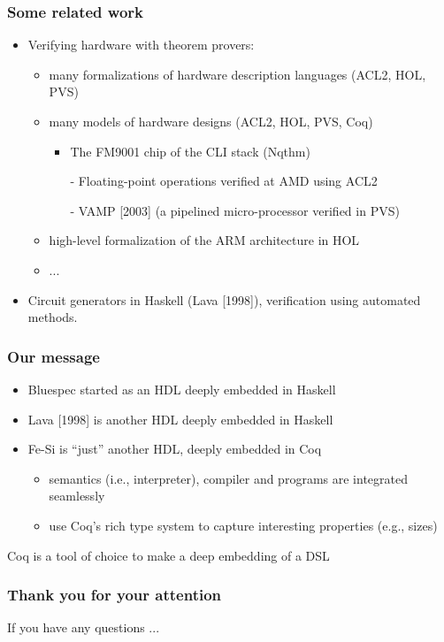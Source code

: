 \documentclass[9pt]{beamer}
\newcommand\fesi{Fe-Si}
\begin{document}
\begin{frame}
  \frametitle{Some related work}
  \begin{itemize}
  \item Verifying hardware with theorem provers:
    \begin{itemize}
    \item many formalizations of hardware description languages (ACL2, HOL, PVS)
    \item many models of hardware designs (ACL2, HOL, PVS, Coq)
      \begin{itemize}
      \item The FM9001 chip of the CLI stack (Nqthm)
      \item[-] Floating-point operations verified at AMD using ACL2
      \item[-] VAMP [2003] (a pipelined micro-processor verified in
        PVS)
      \end{itemize}
    \item high-level formalization of the ARM architecture in HOL
    \item ...
    \end{itemize}
  \item Circuit generators in Haskell (Lava [1998]), verification using
    automated methods. 
  \end{itemize}
\end{frame}

\begin{frame}
  \frametitle{Our message}
   
    \begin{itemize}
    \item Bluespec started as an HDL deeply embedded in Haskell
    \item Lava [1998] is another HDL deeply embedded in Haskell
    \item \fesi{} is ``just'' another HDL,  deeply embedded in \alert{Coq}
      \pause
      \begin{itemize}
      \item semantics (i.e., interpreter), compiler and programs are \alert{integrated seamlessly}
      \item use Coq's rich type system to capture interesting properties (e.g., sizes)
      \end{itemize}
    \end{itemize}

    \pause

    \begin{center}
      Coq is a tool of choice to make a deep embedding of a \alert{DSL}
    \end{center}
\end{frame}


\begin{frame}
  \frametitle{Thank you for your attention}
  
  \begin{center}

    \vspace{1cm}

    If you have any questions ... \\
  \end{center}
  
\end{frame}
\end{document}
